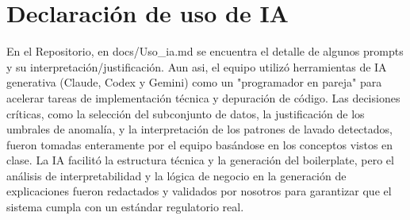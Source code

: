 \documentclass[11pt,a4paper]{article}
\begin{document}
\section*{Declaración de uso de IA}
En el Repositorio, en docs/Uso_ia.md se encuentra el detalle de algunos prompts y su interpretación/justificación. Aun asi, el equipo utilizó herramientas de IA generativa (Claude, Codex y Gemini) como un "programador en pareja" para acelerar tareas de implementación técnica y depuración de código. Las decisiones críticas, como la selección del subconjunto de datos, la justificación de los umbrales de anomalía, y la interpretación de los patrones de lavado detectados, fueron tomadas enteramente por el equipo basándose en los conceptos vistos en clase. La IA facilitó la estructura técnica y la generación del boilerplate, pero el análisis de interpretabilidad y la lógica de negocio en la generación de explicaciones fueron redactados y validados por nosotros para garantizar que el sistema cumpla con un estándar regulatorio real.
\end{document}
